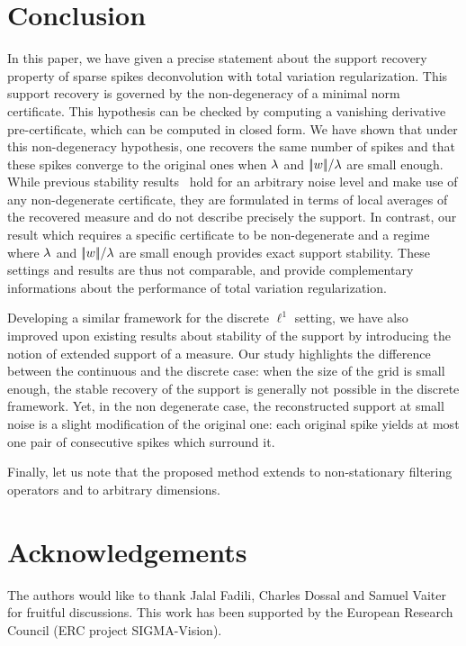 
\section*{Conclusion}


In this paper, we have given a precise statement about the support recovery property of sparse spikes deconvolution with total variation regularization.
%
This support recovery is governed by the non-degeneracy of a minimal norm certificate. This hypothesis can be checked by computing a vanishing derivative pre-certificate, which can be computed in closed form.
%
We have shown that under this non-degeneracy hypothesis, one recovers the same number of spikes and that these spikes converge to the original ones when $\lambda$ and $|\!| w |\!|/\lambda$ are small enough. 
% 
While previous stability results~\cite{Candes-superresol-noisy,Fernandez-Granda-support,Azais-inaccurate} hold for an arbitrary noise level and make use of any non-degenerate certificate, they are formulated in terms of local averages of the recovered measure and do not describe precisely the support. In contrast, our result which requires a specific certificate to be non-degenerate and a regime where $\lambda$ and $|\!| w |\!|/\lambda$ are small enough provides exact support stability. These settings and results are thus not comparable, and provide complementary informations about the performance of total variation regularization. 
 
Developing a similar framework for the discrete $\ell^1$ setting, we have also improved upon existing results about stability of the support by introducing the notion of extended support of a measure. Our study highlights the difference between the continuous and the discrete case: when the size of the grid is small enough, the stable recovery of the support is generally not possible in the discrete framework. Yet,  in the non degenerate case, the reconstructed support at small noise is a slight modification of the original one: each original spike yields at most one pair of consecutive spikes which surround it.
  
Finally, let us note that the proposed method extends to non-stationary filtering operators and to arbitrary dimensions. 


\section*{Acknowledgements} 

The authors would like to thank Jalal Fadili, Charles Dossal and Samuel Vaiter for fruitful discussions. This work has been supported by the European Research Council (ERC project SIGMA-Vision).
